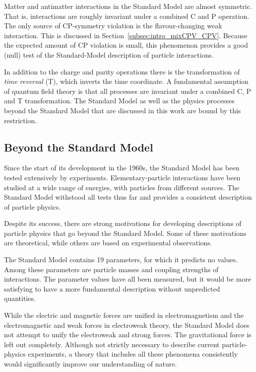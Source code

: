 Matter and antimatter interactions in the Standard Model are almost symmetric. That is, interactions are roughly invariant under a
combined C and P operation. The only source of CP-symmetry violation is the flavour-changing weak interaction. This is discussed in
Section~\ref{subsec:intro_mixCPV_CPV}. Because the expected amount of CP violation is small, this phenomenon provides a good (null) test of
the Standard-Model description of particle interactions.

In addition to the charge and parity operations there is the transformation of \emph{time reversal} (T), which inverts the time coordinate.
A fundamental assumption of quantum field theory is that all processes are invariant under a combined C, P and T transformation. The
Standard Model as well as the physics processes beyond the Standard Model that are discussed in this work are bound by this restriction.


\subsection{Beyond the Standard Model}
\label{subsec:intro_SM_beyond}

Since the start of its development in the 1960s, the Standard Model has been tested extensively by experiments. Elementary-particle
interactions have been studied at a wide range of energies, with particles from different sources. The Standard Model withstood all tests
thus far and provides a consistent description of particle physics.

Despite its success, there are strong motivations for developing descriptions of particle physics that go beyond the Standard Model. Some
of these motivations are theoretical, while others are based on experimental observations.

The Standard Model contains 19 parameters, for which it predicts no values. Among these parameters are particle masses and coupling
strengths of interactions. The parameter values have all been measured, but it would be more satisfying to have a more fundamental
description without unpredicted quantities.

While the electric and magnetic forces are unified in electromagnetism and the electromagnetic and weak forces in electroweak theory, the
Standard Model does not attempt to unify the electroweak and strong forces. The gravitational force is left out completely. Although not
strictly necessary to describe current particle-physics experiments, a theory that includes all these phenomena consistently would
significantly improve our understanding of nature.

